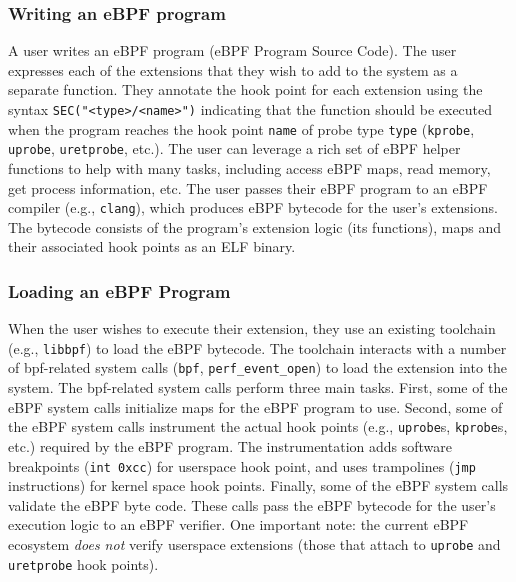 \subsubsection{Writing an eBPF program}

A user writes an eBPF program (eBPF Program Source Code).  The user expresses each of the extensions that they wish to add to the system as a separate function. They annotate the hook point for each extension using the syntax \texttt{SEC("<type>/<name>")} indicating that the function should be executed when the program reaches the hook point \texttt{name} of probe type \texttt{type} (\eg \texttt{kprobe}, \texttt{uprobe}, \texttt{uretprobe}, etc.).  The user can leverage a rich set of eBPF helper functions to help with many tasks, including access eBPF maps, read memory, get process information, etc.   The user passes their eBPF program to an eBPF compiler (e.g., \texttt{clang}), which produces eBPF bytecode for the user's extensions. The bytecode consists of the program's extension logic (\ie its functions), maps and their associated hook points as an ELF binary.  

\subsubsection{Loading an eBPF Program}

When the user wishes to execute their extension, they use an existing toolchain (e.g., \texttt{libbpf}) to load the eBPF bytecode.  The toolchain interacts with a number of bpf-related system calls (\eg \texttt{bpf}, \texttt{perf_event_open}) to load the extension into the system.  The bpf-related system calls perform three main tasks.  First, some of the eBPF system calls initialize maps for the eBPF program to use. Second, some of the eBPF system calls instrument the actual hook points (e.g., \texttt{uprobe}s, \texttt{kprobe}s, etc.) required by the eBPF program.  The instrumentation adds software breakpoints (\ie \texttt{int 0xcc}) for userspace hook point, and uses trampolines (\ie \texttt{jmp} instructions) for kernel space hook points.  Finally, some of the eBPF system calls validate the eBPF byte code. These calls pass the eBPF bytecode for the user's execution logic to an eBPF verifier.  One important note: the current eBPF ecosystem \emph{does not} verify userspace extensions (\ie those that attach to \texttt{uprobe} and \texttt{uretprobe} hook points).
 

